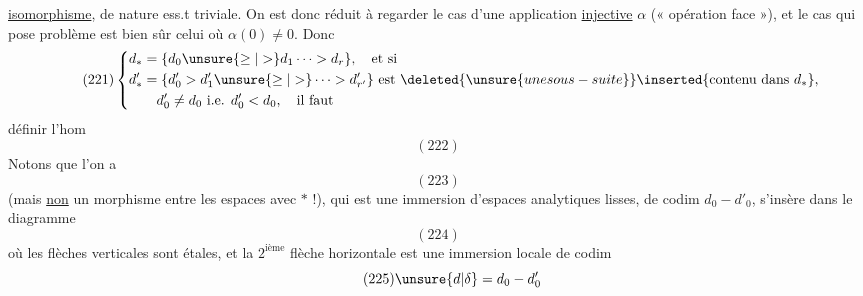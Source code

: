 \uline{isomorphisme}, de nature ess.t triviale.
On est donc réduit à regarder le
cas d'une application \uline{injective} $\alpha$ (« opération
face »), et le  cas qui  pose problème
est bien sûr celui où $\alpha(0)\ne0$. Donc
\[
\tag{221}
\left\{\begin{aligned}
d_*&=\{d_0\unsure{\geq|>}d_1\cdots>d_r\},\quad\text{et si}\\
d'_*&=\{d'_0>d'_1\unsure{\geq|>}\cdots>d'_{r'}\}\text{ est }
\deleted{\unsure{une sous-suite}}\inserted{\text{contenu dans }d_*},\\
&\quad d'_0\ne d_0\text{ i.e. }d'_0<d_0,\quad\text{il faut}
\end{aligned}\right.
\]
définir l'hom
\[
(222)
\]
Notons que l'on a
\[
(223)
\]
(mais \uline{non} un morphisme entre les
espaces avec $*$ !), qui est une immersion 
d'espaces analytiques lisses, de codim
$d_0-d'_0$,  s'insère dans le diagramme
\[
(224)
\]
où les flèches verticales sont étales,
et la $2^{\mathrm{ième}}$ flèche horizontale est une
immersion locale de codim 
\[
\tag{225}\unsure{d|\delta}=d_0-d'_0
\]
